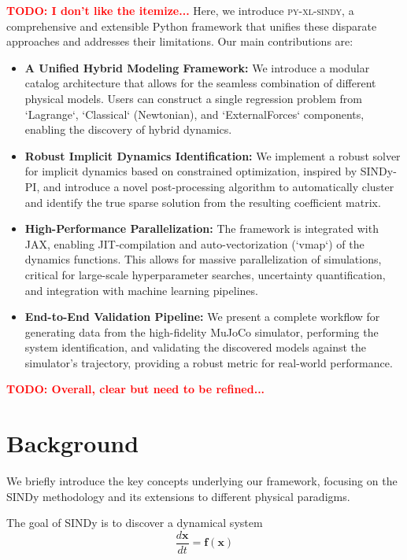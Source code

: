 \documentclass[12pt]{article}
\newcommand{\frameworkname}{\textsc{py-xl-sindy}}
\newcommand{\TODO}[1]{\textbf{\textcolor{red}{\Large TODO: \normalsize #1}}}
\begin{document}
\TODO{I don't like the itemize...}
Here, we introduce \frameworkname, a comprehensive and extensible Python framework that unifies these disparate approaches and addresses their limitations. Our main contributions are:
\begin{itemize}
    \item \textbf{A Unified Hybrid Modeling Framework:} We introduce a modular catalog architecture that allows for the seamless combination of different physical models. Users can construct a single regression problem from `Lagrange`, `Classical` (Newtonian), and `ExternalForces` components, enabling the discovery of hybrid dynamics.
    \item \textbf{Robust Implicit Dynamics Identification:} We implement a robust solver for implicit dynamics based on constrained optimization, inspired by SINDy-PI, and introduce a novel post-processing algorithm to automatically cluster and identify the true sparse solution from the resulting coefficient matrix.
    \item \textbf{High-Performance Parallelization:} The framework is integrated with JAX, enabling JIT-compilation and auto-vectorization (`vmap`) of the dynamics functions. This allows for massive parallelization of simulations, critical for large-scale hyperparameter searches, uncertainty quantification, and integration with machine learning pipelines.
    \item \textbf{End-to-End Validation Pipeline:} We present a complete workflow for generating data from the high-fidelity MuJoCo simulator, performing the system identification, and validating the discovered models against the simulator's trajectory, providing a robust metric for real-world performance.
\end{itemize}

\TODO{Overall, clear but need to be refined... }

\section*{Background}

We briefly introduce the key concepts underlying our framework, focusing on the SINDy methodology and its extensions to different physical paradigms.

The goal of SINDy is to discover a dynamical system 
\begin{equation}
	\frac{d\mathbf{x}}{dt} = \mathbf{f}(\mathbf{x})
\end{equation}
\end{document}
